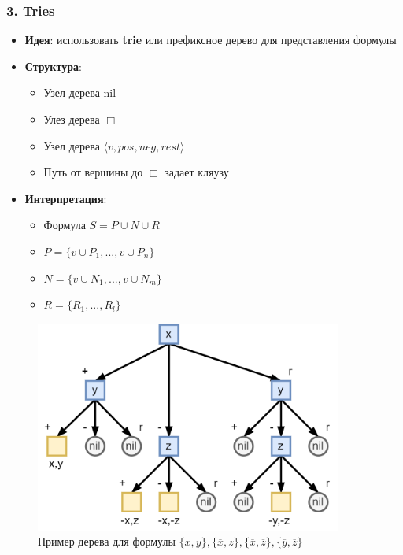 \documentclass[aspectratio=169,xcolor=table,english]{beamer}
\begin{document}
\begin{frame}[fragile] \frametitle{3. Tries}
    \begin{minipage}[m]{0.5\linewidth}
        \begin{itemize}
            \item \textbf{Идея}: использовать \textbf{trie} или префиксное дерево для представления формулы
            \item \textbf{Структура}:
            \begin{itemize}
                \item Узел дерева nil
                \item Улез дерева $\Box$
                \item Узел дерева $\langle v, pos, neg, rest \rangle$
                \item Путь от вершины до $\Box$ задает кляузу
            \end{itemize}
            \item \textbf{Интерпретация}:
            \begin{itemize}
                \item Формула $S = P \cup N \cup R$
                \item $P = \{v \cup P_1, ..., v \cup P_n\}$
                \item $N = \{\overline{v} \cup N_1, ..., \overline{v} \cup N _m\}$
                \item $R = \{R_1, ..., R_l\}$
            \end{itemize}
        \end{itemize}
    \end{minipage}\hfill
    \begin{minipage}[m]{0.45\linewidth}
        \begin{figure}
            \centering
            \includegraphics[width=0.9\textwidth]{figures/trie.png}
            \caption{Пример дерева для формулы $\{x,y\},\{\overline{x},z\},\{\overline{x},\overline{z}\},\{\overline{y},\overline{z}\}$}
        \end{figure}
    \end{minipage}
\end{frame}
\end{document}
